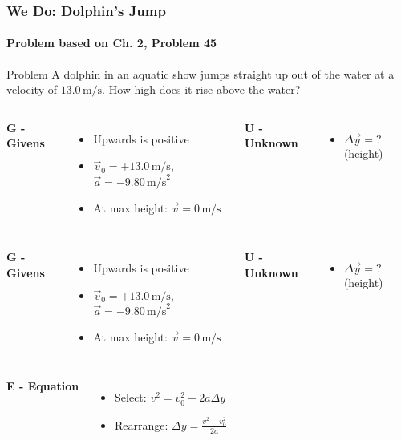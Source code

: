 \documentclass{beamer}
\begin{document}
\begin{frame}
\frametitle{We Do: Dolphin's Jump}
\framesubtitle{Problem based on Ch. 2, Problem 45}
\begin{block}{Problem}
A dolphin in an aquatic show jumps straight up out of the water at a velocity of $13.0 \, \text{m/s}$. How high does it rise above the water?
\end{block}
\pause
\begin{columns}[T]
\textbf{G - Givens}
\begin{itemize}
\item Upwards is positive
\item $\vec{v}_0 = +13.0 \, \text{m/s}$, $\vec{a} = -9.80 \, \text{m/s}^2$
\item At max height: $\vec{v} = 0 \, \text{m/s}$
\end{itemize}
\pause
{}
\textbf{U - Unknown}
\begin{itemize}
\item $\Delta \vec{y} = ?$ (height)
\end{itemize}
\end{columns}
\end{frame}

\begin{frame}
\begin{columns}[T]
\textbf{G - Givens}
\begin{itemize}
\item Upwards is positive
\item $\vec{v}_0 = +13.0 \, \text{m/s}$, $\vec{a} = -9.80 \, \text{m/s}^2$
\item At max height: $\vec{v} = 0 \, \text{m/s}$
\end{itemize}
\pause
{}
\textbf{U - Unknown}
\begin{itemize}
\item $\Delta \vec{y} = ?$ (height)
\end{itemize}
\end{columns}
\pause
\begin{columns}[T]
\textbf{E - Equation}
\begin{itemize}
\item Select: $v^2 = v_0^2 + 2a\Delta y$
\item Rearrange: $\Delta y = \frac{v^2 - v_0^2}{2a}$
\end{itemize}
\end{columns}
\end{frame}
\end{document}
